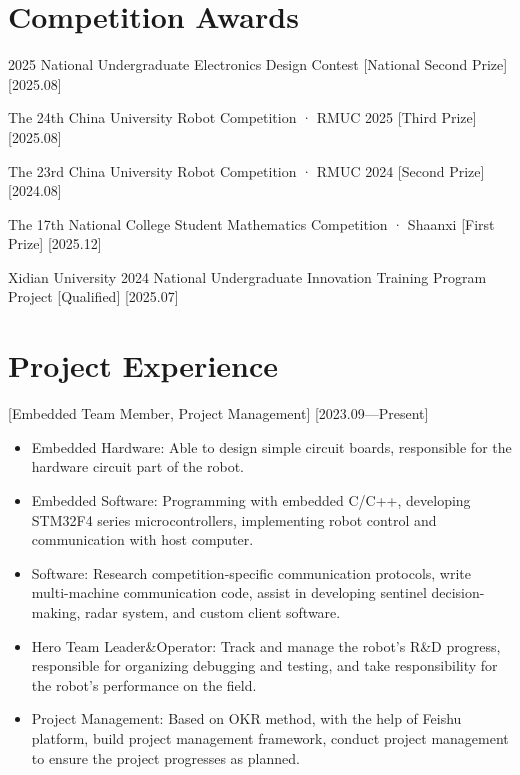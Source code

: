 \documentclass{resume}
\begin{document}
\section{Competition Awards}

\ResumeItem
{2025 National Undergraduate Electronics Design Contest}
[National Second Prize]
[2025.08]

\ResumeItem
{The 24th China University Robot Competition · RMUC 2025}
[Third Prize]
[2025.08]

\ResumeItem
{The 23rd China University Robot Competition · RMUC 2024}
[Second Prize]
[2024.08]

\ResumeItem
{The 17th National College Student Mathematics Competition · Shaanxi}
[First Prize]
[2025.12]

\ResumeItem
{Xidian University 2024 National Undergraduate Innovation Training Program Project}
[Qualified]
[2025.07]

\section{Project Experience}

[\textnormal{Embedded Team Member, Project Management}]
[2023.09—Present]
\begin{itemize}
  \item Embedded Hardware: Able to design simple circuit boards, responsible for the hardware circuit part of the robot.
  \item Embedded Software: Programming with embedded C/C++, developing STM32F4 series microcontrollers, implementing robot control and communication with host computer.
  \item Software: Research competition-specific communication protocols, write multi-machine communication code, assist in developing sentinel decision-making, radar system, and custom client software.
  \item Hero Team Leader\&Operator: Track and manage the robot's R\&D progress, responsible for organizing debugging and testing, and take responsibility for the robot's performance on the field.
  \item Project Management: Based on OKR method, with the help of Feishu platform, build project management framework, conduct project management to ensure the project progresses as planned.
\end{itemize}
\end{document}
